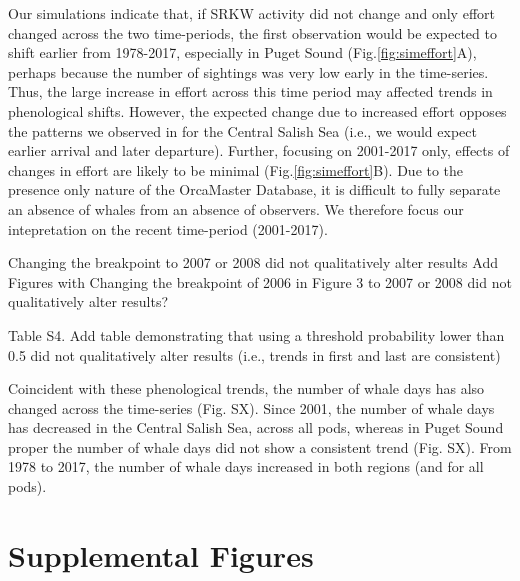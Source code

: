 \documentclass{article}
\begin{document}
\par Our simulations indicate that, if SRKW activity did not change and only effort changed across the two time-periods, the first observation would be expected to shift earlier from 1978-2017, especially in Puget Sound (Fig.\ref{fig:simeffort}A), perhaps because the number of sightings was very low early in the time-series. Thus, the large increase in effort across this time period may affected trends in phenological shifts.  However, the expected change due to increased effort opposes the patterns we observed in for the Central Salish Sea (i.e., we would expect earlier arrival and later departure). Further, focusing on 2001-2017 only, effects of changes in effort are likely to be minimal (Fig.\ref{fig:simeffort}B). Due to the presence only nature of the OrcaMaster Database, it is difficult to fully separate an absence of whales from an absence of observers. We therefore focus our intepretation on the recent time-period (2001-2017).

\par Changing the breakpoint to 2007 or 2008 did not qualitatively alter results 
Add Figures with Changing the breakpoint of 2006 in Figure 3 to 2007 or 2008 did not qualitatively alter results?
\par Table S4. Add table demonstrating that using a threshold probability lower than 0.5 did not qualitatively alter results (i.e., trends in first and last are consistent)

\par Coincident with these phenological trends, the number of whale days has also changed across the time-series (Fig. SX). Since 2001, the number of whale days has decreased in the Central Salish Sea, across all pods, whereas in Puget Sound proper the number of whale days did not show a consistent trend (Fig. SX). From 1978 to 2017, the number of whale days increased in both regions (and for all pods). 


\pagebreak

\section* {Supplemental Figures}

\end{document}
